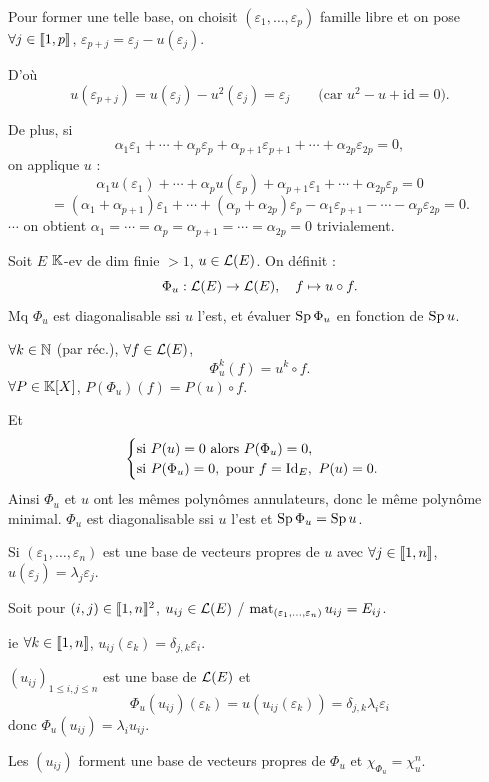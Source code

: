 \begin{solution}
\begin{remarkbox}
Pour former une telle base, on choisit $(\varepsilon_1,\dots,\varepsilon_p)$
famille libre et on pose $\forall j\in\llbracket 1,p\rrbracket$,
$\varepsilon_{p+j}=\varepsilon_j-u(\varepsilon_j)$.

D'où
\[
u(\varepsilon_{p+j})=u(\varepsilon_j)-u^2(\varepsilon_j)
=\varepsilon_j
\qquad\text{(car $u^2-u+\mathrm{id}=0$)}.
\]

De plus, si
\[
\alpha_1\varepsilon_1+\cdots+\alpha_p\varepsilon_p
+\alpha_{p+1}\varepsilon_{p+1}+\cdots+\alpha_{2p}\varepsilon_{2p}=0,
\]
on applique $u$ :
\[
\alpha_1u(\varepsilon_1)+\cdots+\alpha_pu(\varepsilon_p)
+\alpha_{p+1}\varepsilon_1+\cdots+\alpha_{2p}\varepsilon_p=0
\]
\[
=(\alpha_1+\alpha_{p+1})\varepsilon_1+\cdots
+(\alpha_p+\alpha_{2p})\varepsilon_p
-\alpha_1\varepsilon_{p+1}-\cdots-\alpha_p\varepsilon_{2p}=0.
\]
$\cdots$ on obtient
$\alpha_1=\cdots=\alpha_p=\alpha_{p+1}=\cdots=\alpha_{2p}=0$
trivialement.
\end{remarkbox}
\end{solution}


\begin{statementbox}
Soit $E$ $\mathbb K$-ev de dim finie $>1$, $u\in\mathcal L(E)$.
On définit :
\[
\Phi_u:\mathcal L(E)\to\mathcal L(E),\quad f\mapsto u\circ f.
\]
Mq $\Phi_u$ est diagonalisable ssi $u$ l'est, et évaluer $\operatorname{Sp}\Phi_u$ en
fonction de $\operatorname{Sp} u$.
\end{statementbox}

\begin{solution}
$\forall k\in\mathbb N$ (par réc.), $\forall f\in\mathcal L(E)$,
\[
\Phi_u^k(f)=u^k\circ f.
\]
$\forall P\in\mathbb K[X]$, $P(\Phi_u)(f)=P(u)\circ f$.

Et
\[
\begin{cases}
\text{si }P(u)=0\text{ alors }P(\Phi_u)=0,\\
\text{si }P(\Phi_u)=0,\text{ pour }f=\operatorname{Id}_E,\ P(u)=0.
\end{cases}
\]
Ainsi $\Phi_u$ et $u$ ont les mêmes polynômes annulateurs, donc le même
polynôme minimal. $\Phi_u$ est diagonalisable ssi $u$ l'est et
$\operatorname{Sp}\Phi_u=\operatorname{Sp} u$.

\begin{remarkbox}
Si $(\varepsilon_1,\dots,\varepsilon_n)$ est une base de vecteurs
propres de $u$ avec $\forall j\in\llbracket 1,n\rrbracket$,
$u(\varepsilon_j)=\lambda_j\varepsilon_j$.

Soit pour $(i,j)\in\llbracket 1,n\rrbracket^2$, $u_{ij}\in\mathcal L(E)$ /
$\operatorname{mat}_{(\varepsilon_1,\dots,\varepsilon_n)}u_{ij}=E_{ij}$.

ie $\forall k\in\llbracket 1,n\rrbracket$, $u_{ij}(\varepsilon_k)=\delta_{j,k}\varepsilon_i$.

$(u_{ij})_{1\leq i,j\leq n}$ est une base de $\mathcal L(E)$ et
\[
\Phi_u(u_{ij})(\varepsilon_k)=u(u_{ij}(\varepsilon_k))
=\delta_{j,k}\lambda_i\varepsilon_i
\]
donc $\Phi_u(u_{ij})=\lambda_i u_{ij}$.

Les $(u_{ij})$ forment une base de vecteurs propres de $\Phi_u$ et
$\chi_{\Phi_u}=\chi_u^n$.
\end{remarkbox}
\end{solution}

